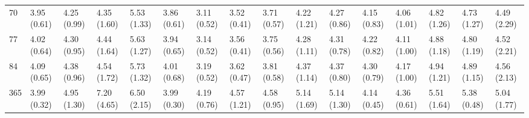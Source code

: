 \begin{tabular}{llllllllllllllll}
70  &  3.95 (0.61) &  4.25 (0.99) &   4.35 (1.60) &  5.53 (1.33) &  3.86 (0.61) &  3.11 (0.52) &  3.52 (0.41) &  3.71 (0.57) &  4.22 (1.21) &  4.27 (0.86) &  4.15 (0.83) &  4.06 (1.01) &  4.82 (1.26) &  4.73 (1.27) &  4.49 (2.29) \\
77  &  4.02 (0.64) &  4.30 (0.95) &   4.44 (1.64) &  5.63 (1.27) &  3.94 (0.65) &  3.14 (0.52) &  3.56 (0.41) &  3.75 (0.56) &  4.28 (1.11) &  4.31 (0.78) &  4.22 (0.82) &  4.11 (1.00) &  4.88 (1.18) &  4.80 (1.19) &  4.52 (2.21) \\
84  &  4.09 (0.65) &  4.38 (0.96) &   4.54 (1.72) &  5.73 (1.32) &  4.01 (0.68) &  3.19 (0.52) &  3.62 (0.47) &  3.81 (0.58) &  4.37 (1.14) &  4.37 (0.80) &  4.30 (0.79) &  4.17 (1.00) &  4.94 (1.21) &  4.89 (1.15) &  4.56 (2.13) \\
365 &  3.99 (0.32) &  4.95 (1.30) &   7.20 (4.65) &  6.50 (2.15) &  3.99 (0.30) &  4.19 (0.76) &  4.57 (1.21) &  4.58 (0.95) &  5.14 (1.69) &  5.14 (1.30) &  4.14 (0.45) &  4.36 (0.61) &  5.51 (1.64) &  5.38 (0.48) &  5.04 (1.77) \\
\bottomrule
\end{tabular}

